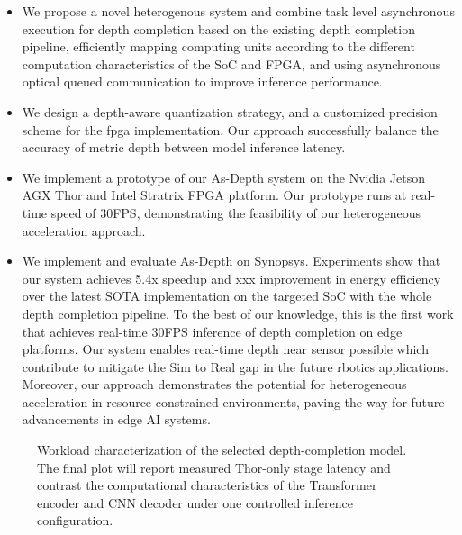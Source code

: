 \begin{itemize}
  \item We propose a novel heterogenous system and combine task level asynchronous execution for depth completion based on the existing depth completion pipeline, efficiently mapping computing units according to the different computation characteristics of the SoC and FPGA, and using asynchronous optical queued communication to improve inference performance. 
  \item We design a depth-aware quantization strategy, and a customized precision scheme for the fpga implementation. Our approach successfully balance the accuracy of metric depth between model inference latency.
  \item We implement a prototype of our As-Depth system on the Nvidia Jetson AGX Thor and Intel Stratrix FPGA platform. Our prototype runs at real-time speed of 30FPS, demonstrating the feasibility of our heterogeneous acceleration approach.
  \item We implement and evaluate As-Depth on Synopsys. Experiments show that our system achieves 5.4x speedup and xxx improvement in energy efficiency over the latest SOTA implementation on the targeted SoC with the whole depth completion pipeline. To the best of our knowledge, this is the first work that achieves real-time 30FPS inference of depth completion on edge platforms.
  Our system enables real-time depth near sensor possible which contribute to mitigate the Sim to Real gap in the future rbotics applications. 
  Moreover, our approach demonstrates the potential for heterogeneous acceleration in resource-constrained environments, paving the way for future advancements in edge AI systems.
\end{itemize}


\begin{figure}[ht]
  \centering
  \caption{Workload characterization of the selected depth-completion model.
  The final plot will report measured Thor-only stage latency and contrast the
  computational characteristics of the Transformer encoder and CNN decoder
  under one controlled inference configuration.}
  \label{fig:workload}
\end{figure}
